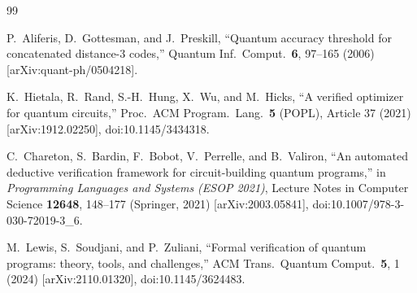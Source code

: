 \documentclass[aps,prx,reprint,nofootinbib,superscriptaddress]{revtex4-2}
\begin{document}
\begin{thebibliography}{99}

P.~Aliferis, D.~Gottesman, and J.~Preskill,
``Quantum accuracy threshold for concatenated distance-3 codes,''
Quantum Inf.\ Comput.\ \textbf{6}, 97--165 (2006)
[arXiv:quant-ph/0504218].

K.~Hietala, R.~Rand, S.-H.~Hung, X.~Wu, and M.~Hicks,
``A verified optimizer for quantum circuits,''
Proc.\ ACM Program.\ Lang.\ \textbf{5} (POPL), Article 37 (2021)
[arXiv:1912.02250], doi:10.1145/3434318.

C.~Chareton, S.~Bardin, F.~Bobot, V.~Perrelle, and B.~Valiron,
``An automated deductive verification framework for circuit-building
quantum programs,''
in \emph{Programming Languages and Systems (ESOP 2021)},
Lecture Notes in Computer Science \textbf{12648}, 148--177
(Springer, 2021) [arXiv:2003.05841], doi:10.1007/978-3-030-72019-3\_6.

M.~Lewis, S.~Soudjani, and P.~Zuliani,
``Formal verification of quantum programs: theory, tools, and
challenges,''
ACM Trans.\ Quantum Comput.\ \textbf{5}, 1 (2024)
[arXiv:2110.01320], doi:10.1145/3624483.

\end{thebibliography}
\end{document}
